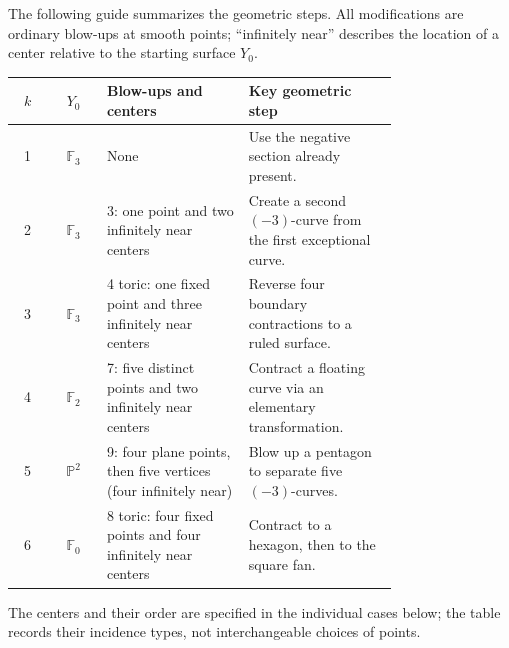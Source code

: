 \documentclass[11pt]{article}
\theoremstyle{plain}
\theoremstyle{definition}
\theoremstyle{remark}
\newcommand{\Pp}{\mathbb P}
\newcommand{\F}{\mathbb F}
\begin{document}
The following guide summarizes the geometric steps. All modifications
are ordinary blow-ups at smooth points; ``infinitely near'' describes
the location of a center relative to the starting surface \(Y_0\).
\begin{center}
\small
\renewcommand{\arraystretch}{1.2}
\begin{tabular}{@{}c c p{0.37\linewidth} p{0.39\linewidth}@{}}
\(k\)&\(Y_0\)&Blow-ups and centers&Key geometric step\\ \hline
1&\(\F_3\)&None&Use the negative section already present.\\
2&\(\F_3\)&3: one point and two infinitely near centers&Create a second
\((-3)\)-curve from the first exceptional curve.\\
3&\(\F_3\)&4 toric: one fixed point and three infinitely near centers&Reverse
four boundary contractions to a ruled surface.\\
4&\(\F_2\)&7: five distinct points and two infinitely near centers&Contract
a floating curve via an elementary transformation.\\
5&\(\Pp^2\)&9: four plane points, then five vertices (four infinitely near)&Blow
up a pentagon to separate five \((-3)\)-curves.\\
6&\(\F_0\)&8 toric: four fixed points and four infinitely near centers&Contract
to a hexagon, then to the square fan.\\
\end{tabular}
\end{center}
The centers and their order are specified in the individual cases below;
the table records their incidence types, not interchangeable choices of
points.
\end{document}
